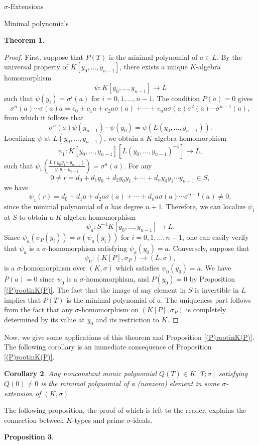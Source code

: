 \documentclass[11pt,a4paper]{article}
\theoremstyle{theorem}
\newtheorem{theorem}{Theorem}[section]
\newtheorem{corollary}[theorem]{Corollary}
\newtheorem{proposition}[theorem]{Proposition}
\numberwithin{equation}{section}
\newcommand{\s}{\sigma}
\begin{document}
\begin{section}{$\s$-Extensions}
\begin{subsection}{Minimal polynomials}
\begin{theorem}
	\end{theorem}
	\begin{proof}
		First, suppose that $P(T)$ is the minimal polynomial of $a\in L$. By the universal property of  $K[y_0,...,y_{n-1}]$, there exists a unique $K$-algebra homomorphism 
		$$\psi:	K[y_0,...,y_{n-1}]\to L$$ such that 
		$\psi(y_i)=\s^i(a)$ for $i=0,1,...,n-1$.
		The condition $P(a)=0$ gives
		$$\s^{n}(a)\cdots\s(a)a
		=c_{0}+c_{1}a+c_{2}a\s(a)+\cdots+c_{n}a\s(a)\s^2(a)\cdots \s^{n-1}(a),
		$$
		from which it follows that $$\s^{n}(a)\psi(y_{n-1})\cdots \psi(y_0)=\psi(L(y_0,...,y_{n-1})).$$  Localizing $\psi$ at $L(y_0,...,y_{n-1})$, we obtain 
		a $K$-algebra homomorphism 
		$$\psi_1:	K[y_0,...,y_{n-1}][L(y_0,...,y_{n-1})^{-1}]\to L,$$
		such that $\psi_1(\frac{L(y_0y_1\cdots y_{n-1})}{y_0y_1\cdots y_{n-1}})=\s^{n}(a)$. For any 
		$$0\neq r=d_0+d_1y_0+d_2y_0y_1+\cdots+d_ny_0y_1\cdots y_{n-1}\in  S,$$
		we have
		$$\psi_1(r)=d_0+d_1a+d_2a\s(a)+\cdots+d_na\s(a)\cdots \s^{n-1}(a)\neq0,$$
		since the minimal polynomial of $a$ has degree $n+1$. Therefore, we can localize  $\psi_1$ at $S$ to obtain 
		a $K$-algebra homomorphism 
		$$\psi_a:	S^{-1} K[y_0,...,y_{n-1}]\to L.$$ 
		Since $\psi_a(\s_P(y_i))=\s(\psi_a(y_i))$ for $i=0,1,...,n-1$, one can easily verify that $\psi_a$ is a $\s$-homomorphism satisfying $\psi_a(y_0)=a$. Conversely, suppose that 
		$$\psi_0:(K[P],\sigma_P)\to   (L,\s),$$
		is a $\s$-homomorphism  over $(K,\s)$ which satisfies $\psi_0(y_0)=a$. We have $P(a)=0$ since $\psi_0$ is a $\s$-homomorphism, and $P(y_0)=0$ by Proposition \ref{(P)rootinK(P)}. The fact that the image of any element in $S$ is invertible in $L$ implies that $P(T)$ is the minimal polynomial of $a$. The uniqueness part follows from the fact that any $\s$-homomorphism on $(K[P],\s_P)$ is completely determined  by its value at  $y_0$ and its restriction to $K$. 
	\end{proof}
	Now, we give some applications of this theorem and Proposition \ref{(P)rootinK(P)}. The following corollary is an immediate consequence of  Proposition \ref{(P)rootinK(P)}. 
	\begin{corollary}
		Any nonconstant monic polynomial $Q(T)\in K[T;\s]$ satisfying $Q(0)\neq 0$ is the minimal polynomial of a (nonzero) element in some $\s$-extension of $(K,\s)$.
	\end{corollary}
		The following proposition, the proof of which is left to the reader, explains the connection between $K$-types and prime $\s$-ideals.  
	\begin{proposition}\label{(P)correspondenceKtype}

\end{proposition}
\end{subsection}
\end{section}
\end{document}
